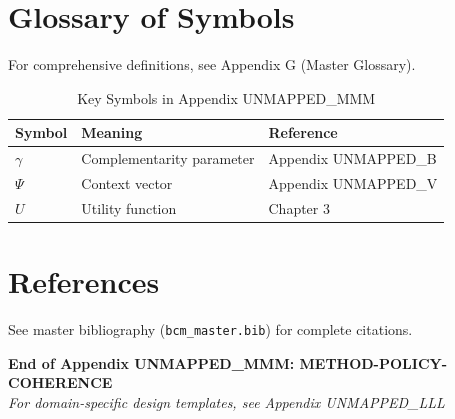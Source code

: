 \section{Glossary of Symbols}
\label{sec:mmm-glossary}

For comprehensive definitions, see Appendix G (Master Glossary).

\begin{table}[htbp]
\centering
\caption{Key Symbols in Appendix UNMAPPED_MMM}
\begin{tabular}{lll}
\toprule
\textbf{Symbol} & \textbf{Meaning} & \textbf{Reference} \\
\midrule
$\gamma$ & Complementarity parameter & Appendix UNMAPPED_B \\
$\Psi$ & Context vector & Appendix UNMAPPED_V \\
$U$ & Utility function & Chapter 3 \\
\bottomrule
\end{tabular}
\end{table}


\section{References}
\label{sec:references}

See master bibliography (\texttt{bcm\_master.bib}) for complete citations.

\nocite{bcm_master}


\vspace{2cm}
\begin{center}
{\large \textbf{End of Appendix UNMAPPED_MMM: METHOD-POLICY-COHERENCE}} \\
\vspace{0.5cm}
{\small \textit{For domain-specific design templates, see Appendix UNMAPPED_LLL}}
\end{center}
